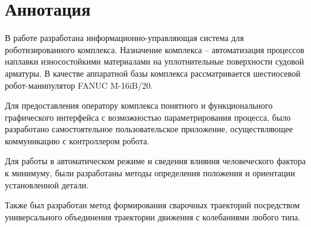 \chapter{Аннотация}
В работе разработана информационно-управляющая система для роботизированного комплекса.
Назначение комплекса -- автоматизация процессов наплавки износостойкими материалами на уплотнительные поверхности судовой арматуры.
В качестве аппаратной базы комплекса рассматривается шестиосевой робот-манипулятор FANUC M-16iB/20.

Для предоставления оператору комплекса понятного и функционального графического интерфейса с возможностью параметрирования процесса, было разработано самостоятельное пользовательское приложение, осуществляющее коммуникацию с контроллером робота.

Для работы в автоматическом режиме и сведения влияния человеческого фактора к минимуму, были разработаны методы определения положения и ориентации установленной детали.

Также был разработан метод формирования сварочных траекторий посредством универсального объединения траектории движения с колебаниями любого типа.
